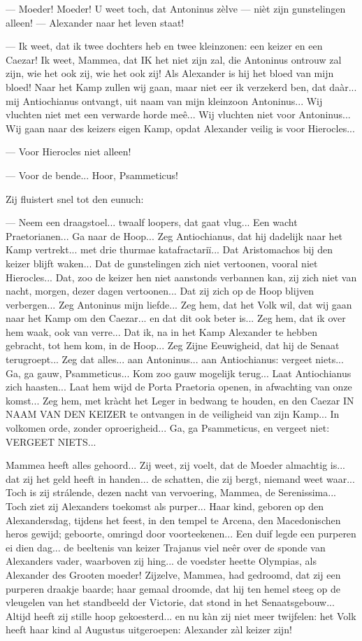 \documentclass[a4paper, 12pt, oneside, dutch]{article}
\begin{document}
--- Moeder! Moeder! U weet toch, dat Antoninus zèlve --- nièt zijn gunstelingen alleen! --- Alexander naar het leven staat!

--- Ik weet, dat ik twee dochters heb en twee kleinzonen: een keizer en een Caezar! Ik weet, Mammea, dat IK het niet zijn zal, die Antoninus ontrouw zal zijn, wie het ook zij, wie het ook zij! Als Alexander is hij het bloed van mijn bloed! Naar het Kamp zullen wij gaan, maar niet eer ik verzekerd ben, dat daàr... mij Antiochianus ontvangt, uit naam van mijn kleinzoon Antoninus... Wij vluchten niet met een verwarde horde meê... Wij vluchten niet voor Antoninus... Wij gaan naar des keizers eigen Kamp, opdat Alexander veilig is voor Hierocles...

--- Voor Hierocles niet alleen!

--- Voor de bende... Hoor, Psammeticus!

Zij fluistert snel tot den eunuch:

--- Neem een draagstoel... twaalf loopers, dat gaat vlug... Een wacht Praetorianen... Ga naar de Hoop... Zeg Antiochianus, dat hij dadelijk naar het Kamp vertrekt... met drie thurmae katafractariï... Dat Aristomachos bij den keizer blijft waken... Dat de gunstelingen zich niet vertoonen, vooral niet Hierocles... Dat, zoo de keizer hen niet aanstonds verbannen kan, zij zich niet van nacht, morgen, dezer dagen vertoonen... Dat zij zich op de Hoop blijven verbergen... Zeg Antoninus mijn liefde... Zeg hem, dat het Volk wil, dat wij gaan naar het Kamp om den Caezar... en dat dit ook beter is... Zeg hem, dat ik over hem waak, ook van verre... Dat ik, na in het Kamp Alexander te hebben gebracht, tot hem kom, in de Hoop... Zeg Zijne Eeuwigheid, dat hij de Senaat terugroept... Zeg dat alles... aan Antoninus... aan Antiochianus: vergeet niets... Ga, ga gauw, Psammeticus... Kom zoo gauw mogelijk terug... Laat Antiochianus zich haasten... Laat hem wijd de Porta Praetoria openen, in afwachting van onze komst... Zeg hem, met kràcht het Leger in bedwang te houden, en den Caezar IN NAAM VAN DEN KEIZER te ontvangen in de veiligheid van zijn Kamp... In volkomen orde, zonder oproerigheid... Ga, ga Psammeticus, en vergeet niet: VERGEET NIETS...

Mammea heeft alles gehoord... Zij weet, zij voelt, dat de Moeder almachtig is... dat zij het geld heeft in handen... de schatten, die zij bergt, niemand weet waar... Toch is zij strálende, dezen nacht van vervoering, Mammea, de Serenissima... Toch ziet zij Alexanders toekomst als purper... Haar kind, geboren op den Alexandersdag, tijdens het feest, in den tempel te Arcena, den Macedonischen heros gewijd; geboorte, omringd door voorteekenen... Een duif legde een purperen ei dien dag... de beeltenis van keizer Trajanus viel neêr over de sponde van Alexanders vader, waarboven zij hing... de voedster heette Olympias, als Alexander des Grooten moeder! Zijzelve, Mammea, had gedroomd, dat zij een purperen draakje baarde; haar gemaal droomde, dat hij ten hemel steeg op de vleugelen van het standbeeld der Victorie, dat stond in het Senaatsgebouw... Altijd heeft zij stille hoop gekoesterd... en nu kàn zij niet meer twijfelen: het Volk heeft haar kind al Augustus uitgeroepen: Alexander zàl keizer zijn!
\end{document}
